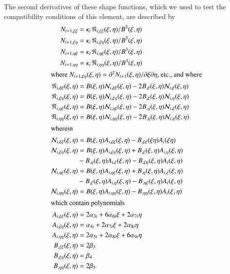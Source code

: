 The second derivatives of these shape functions, which we used to test the compatibility conditions of this element, are described by
\begin{subequations}
	\begin{align}
	N_{i+1,\xi\xi} & = \kappa_i \, \mathfrak{N}_{i,\xi\xi}(\xi,\eta) /
	B^3 (\xi,\eta) \\
	N_{i+1,\xi\eta} & = \kappa_i \, \mathfrak{N}_{i,\xi\eta}(\xi,\eta) /
	B^3(\xi,\eta) \\
	N_{i+1,\eta\xi} & = \kappa_i \, \mathfrak{N}_{i,\eta\xi}(\xi,\eta) /
	B^3(\xi,\eta) \\
	N_{i+1,\eta\eta} & = \kappa_i \, \mathfrak{N}_{i,\eta\eta}(\xi,\eta) /
	B^3(\xi,\eta) \\
	\intertext{where $N_{i+1,\xi\eta}  (\xi, \eta) = \partial^2 N_{i+1} (\xi, \eta) / \partial \xi \partial \eta$, etc., and  where}
	\mathfrak{N}_{i,\xi\xi} (\xi,\eta) & = B(\xi,\eta)
	\mathcal{N}_{i,\xi\xi} (\xi,\eta) - 2 B_{,\xi} (\xi,\eta) 
	\mathcal{N}_{i,\xi} (\xi,\eta) \\
	\mathfrak{N}_{i,\xi\eta}  (\xi,\eta)& = B(\xi,\eta) 
	\mathcal{N}_{i,\xi\eta} (\xi,\eta) - 2 B_{,\xi} (\xi,\eta) 
	\mathcal{N}_{i,\eta} (\xi,\eta) \\
	\mathfrak{N}_{i,\eta\xi}  (\xi,\eta)& = B(\xi,\eta)
	\mathcal{N}_{i,\eta\xi} (\xi,\eta) - 2 B_{,\eta} (\xi,\eta) 
	\mathcal{N}_{i,\xi} (\xi,\eta) \\
	\mathfrak{N}_{i,\eta\eta} (\xi,\eta) & = B(\xi,\eta) 
	\mathcal{N}_{i,\eta\eta} (\xi,\eta) - 2 B_{,\eta} (\xi,\eta) 
	\mathcal{N}_{i,\eta} (\xi,\eta) \\
	\intertext{wherein}
	\mathcal{N}_{i,\xi\xi} (\xi,\eta) & = B(\xi,\eta) A_{i,\xi\xi} (\xi,\eta) -
	B_{,\xi\xi} (\xi\eta) A_{i} (\xi\eta) \\
	\mathcal{N}_{i,\xi\eta} (\xi,\eta) & = B (\xi,\eta) A_{i,\xi\eta} (\xi,\eta) +
	B_{,\xi} (\xi,\eta) A_{i,\eta} (\xi,\eta) \notag \\
	\mbox{} & - B_{,\eta} (\xi,\eta) A_{i,\xi} (\xi,\eta) - 
	B_{,\xi\eta} (\xi,\eta) A_i (\xi,\eta) \\
	\mathcal{N}_{i,\eta\xi} (\xi,\eta) & = B (\xi,\eta) A_{i,\eta\xi} (\xi,\eta) +
	B_{,\eta} (\xi,\eta) A_{i,\xi} (\xi,\eta) \notag \\
	\mbox{} & - B_{,\xi} (\xi,\eta) A_{i,\eta} (\xi,\eta) - 
	B_{,\eta\xi} (\xi,\eta) A_i (\xi,\eta)  \\
	\mathcal{N}_{i,\eta\eta} (\xi,\eta) & = B(\xi,\eta) A_{i,\eta\eta} (\xi,\eta) -
	B_{,\eta\eta} (\xi,\eta) A_{i} (\xi,\eta) \\
	\intertext{which contain polynomials}
	A_{i,\xi\xi} (\xi,\eta) & = 2 \alpha_{3i} + 6 \alpha_{6i} \xi + 2 \alpha_{7i} \eta \\
	A_{i,\xi\eta} (\xi,\eta) & = \alpha_{4i} + 2 \alpha_{7i} \xi + 2 \alpha_{8i} \eta \\
	A_{i,\eta\eta} (\xi,\eta) & = 2 \alpha_{5i} + 2 \alpha_{8i} \xi + 6 \alpha_{9i} \eta \\
	B_{,\xi\xi} (\xi,\eta) & = 2 \beta_3 \\
	B_{,\xi\eta} (\xi,\eta) & = \beta_4 \\
	B_{,\eta\eta} (\xi,\eta) & = 2 \beta_5
	\end{align}
\end{subequations}
